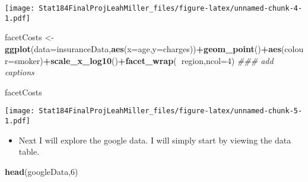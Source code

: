 \documentclass[]{article}
\newenvironment{Shaded}{\begin{snugshade}}{\end{snugshade}}
\newcommand{\CommentTok}[1]{\textcolor[rgb]{0.56,0.35,0.01}{\textit{#1}}}
\newcommand{\DataTypeTok}[1]{\textcolor[rgb]{0.13,0.29,0.53}{#1}}
\newcommand{\DecValTok}[1]{\textcolor[rgb]{0.00,0.00,0.81}{#1}}
\newcommand{\KeywordTok}[1]{\textcolor[rgb]{0.13,0.29,0.53}{\textbf{#1}}}
\newcommand{\NormalTok}[1]{#1}
\newcommand{\OperatorTok}[1]{\textcolor[rgb]{0.81,0.36,0.00}{\textbf{#1}}}
\newcommand{\StringTok}[1]{\textcolor[rgb]{0.31,0.60,0.02}{#1}}
\providecommand{\tightlist}{%
  \setlength{\itemsep}{0pt}\setlength{\parskip}{0pt}}
\begin{document}
\texttt{[image: Stat184FinalProjLeahMiller\_files/figure-latex/unnamed-chunk-4-1.pdf]}

\begin{Shaded}
\begin{Highlighting}[]
\NormalTok{facetCosts <-}\StringTok{ }\KeywordTok{ggplot}\NormalTok{(}\DataTypeTok{data=}\NormalTok{insuranceData,}\KeywordTok{aes}\NormalTok{(}\DataTypeTok{x=}\NormalTok{age,}\DataTypeTok{y=}\NormalTok{charges))}\OperatorTok{+}\KeywordTok{geom_point}\NormalTok{()}\OperatorTok{+}\KeywordTok{aes}\NormalTok{(}\DataTypeTok{colour=}\NormalTok{smoker)}\OperatorTok{+}\KeywordTok{scale_x_log10}\NormalTok{()}\OperatorTok{+}\KeywordTok{facet_wrap}\NormalTok{(}\OperatorTok{~}\NormalTok{region,}\DataTypeTok{ncol=}\DecValTok{4}\NormalTok{) }
\CommentTok{### add captions}

\NormalTok{facetCosts}
\end{Highlighting}
\end{Shaded}

\texttt{[image: Stat184FinalProjLeahMiller\_files/figure-latex/unnamed-chunk-5-1.pdf]}

\begin{itemize}
\tightlist
\item
  Next I will explore the google data. I will simply start by viewing
  the data table.
\end{itemize}

\begin{Shaded}
\begin{Highlighting}[]
\KeywordTok{head}\NormalTok{(googleData,}\DecValTok{6}\NormalTok{)}
\end{Highlighting}
\end{Shaded}
\end{document}
